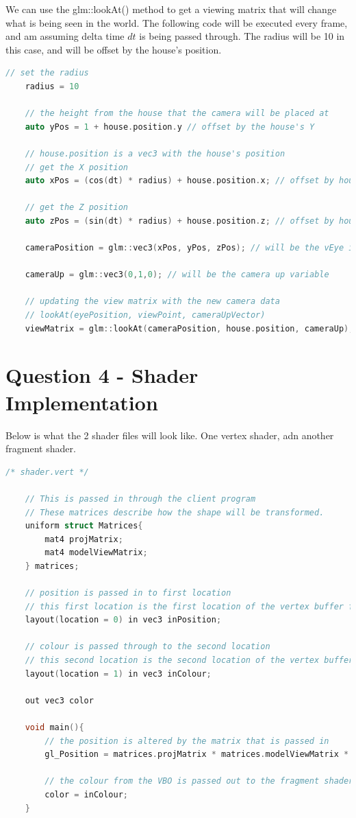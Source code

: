 \documentclass[10pt]{report}
\begin{document}
We can use the glm::lookAt() method to get a viewing matrix that will change what is being seen in the world. The following code will be executed every frame, and am assuming delta time \(dt\) is being passed through. The radius will be 10 in this case, and will be offset by the house's position.

\begin{lstlisting}[language = c]
    // set the radius
    radius = 10

    // the height from the house that the camera will be placed at
    auto yPos = 1 + house.position.y // offset by the house's Y

    // house.position is a vec3 with the house's position
    // get the X position 
    auto xPos = (cos(dt) * radius) + house.position.x; // offset by house's X

    // get the Z position
    auto zPos = (sin(dt) * radius) + house.position.z; // offset by house's Z

    cameraPosition = glm::vec3(xPos, yPos, zPos); // will be the vEye in the lookAt

    cameraUp = glm::vec3(0,1,0); // will be the camera up variable

    // updating the view matrix with the new camera data
    // lookAt(eyePosition, viewPoint, cameraUpVector)
    viewMatrix = glm::lookAt(cameraPosition, house.position, cameraUp);

\end{lstlisting}


\chapter{Question 4 - Shader Implementation}

Below is what the 2 shader files will look like. One vertex shader, adn another fragment shader.

\begin{lstlisting}[language = c]
/* shader.vert */
    
    // This is passed in through the client program
    // These matrices describe how the shape will be transformed.
    uniform struct Matrices{
        mat4 projMatrix;
        mat4 modelViewMatrix;
    } matrices;

    // position is passed in to first location
    // this first location is the first location of the vertex buffer from the vao which contained the x y z
    layout(location = 0) in vec3 inPosition;

    // colour is passed through to the second location
    // this second location is the second location of the vertex buffer from the vao which contains the r g b
    layout(location = 1) in vec3 inColour;

    out vec3 color

    void main(){
        // the position is altered by the matrix that is passed in
        gl_Position = matrices.projMatrix * matrices.modelViewMatrix * vec4(inPosition, 1.0f);

        // the colour from the VBO is passed out to the fragment shader
        color = inColour;
    }
\end{lstlisting}
\end{document}
